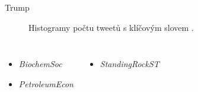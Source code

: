 \documentclass[notheorems,12pt]{beamer}
\begin{document}
\begin{frame}{Trump}
    \begin{figure}
        \centering
        \vspace{-0.7cm}
        \caption*{Histogramy počtu tweetů s klíčovým slovem \textit{}.}
    \end{figure}
    \begin{columns}
    \column{6cm}
    	\begin{itemize}
    		\item \textit{BiochemSoc}
    		\item \textit{PetroleumEcon}
    	\end{itemize}
    \column{6cm}
    	\begin{itemize}
    		\item \textit{StandingRockST}
    	\end{itemize}
    \end{columns}
\end{frame}
\end{document}
